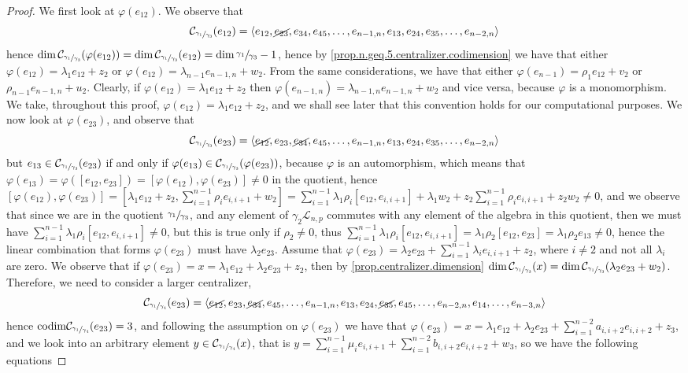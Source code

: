\documentclass[12pt,fleqn]{article}
\begin{document}
\begin{proof}
We first look at $\varphi(e_{12})$. We observe that \[\mathcal{C}_{\sfrac{\gamma_1}{\gamma_3}}(e_{12})=\langle e_{12},\cancel{e_{23}},e_{34},e_{45},\dots,e_{n-1,n},e_{13},e_{24},e_{35},\dots,e_{n-2,n}\rangle\] hence $\dim\mathcal{C}_{\sfrac{\gamma_1}{\gamma_3}}(\varphi(e_{12}))=\dim\mathcal{C}_{\sfrac{\gamma_1}{\gamma_3}}(e_{12})=\dim\sfrac{\gamma_1}{\gamma_3}-1$, hence by \ref{prop.n.geq.5.centralizer.codimension} we have that either $\varphi(e_{12})=\lambda_1 e_{12}+z_2$ or $\varphi(e_{12})=\lambda_{n-1}e_{n-1,n}+w_2$. From the same considerations, we have that either $\varphi(e_{n-1})=\rho_1 e_{12}+v_2$ or $\rho_{n-1}e_{n-1,n}+u_2$. Clearly, if $\varphi(e_{12})=\lambda_1 e_{12}+z_2$ then $\varphi(e_{n-1,n})=\lambda_{n-1,n} e_{n-1,n}+w_2$ and vice versa, because $\varphi$ is a monomorphism. We take, throughout this proof, $\varphi(e_{12})=\lambda_1 e_{12}+z_2$, and we shall see later that this convention holds for our computational purposes. We now look at $\varphi(e_{23})$, and observe that \[\mathcal{C}_{\sfrac{\gamma_1}{\gamma_3}}(e_{23})=\langle\cancel{e_{12}},e_{23},\cancel{e_{34}},e_{45},\dots,e_{n-1,n},e_{13},e_{24},e_{35},\dots,e_{n-2,n}\rangle\] 
but $e_{13}\in\mathcal{C}_{\sfrac{\gamma_1}{\gamma_3}}(e_{23})$ if and only if $\varphi(e_{13})\in\mathcal{C}_{\sfrac{\gamma_1}{\gamma_3}}(\varphi(e_{23}))$, because $\varphi$ is an automorphism, which means that  $\varphi(e_{13})=\varphi([e_{12},e_{23}])=[\varphi(e_{12}),\varphi(e_{23})]\neq 0$ in the quotient, hence $[\varphi(e_{12}),\varphi(e_{23})]=[\lambda_1 e_{12}+z_2,\sum_{i=1}^{n-1}\rho_i e_{i,i+1}+w_2]=\sum_{i=1}^{n-1}\lambda_1\rho_i [e_{12},e_{i,i+1}]+\lambda_1 w_2+z_2\sum_{i=1}^{n-1}\rho_i e_{i,i+1}+z_2 w_2\neq 0$, and we observe that since we are in the quotient $\sfrac{\gamma_1}{\gamma_3}$, and any element of $\gamma_2\mathcal{L}_{n,p}$ commutes with any element of the algebra in this quotient, then we must have $\sum_{i=1}^{n-1}\lambda_1\rho_i [e_{12},e_{i,i+1}]\neq 0$, but this is true only if $\rho_2\neq 0$, thus $\sum_{i=1}^{n-1}\lambda_1\rho_i [e_{12},e_{i,i+1}]=\lambda_1\rho_2[e_{12},e_{23}]=\lambda_1\rho_2 e_{13}\neq 0$, hence the linear combination that forms $\varphi(e_{23})$ must have $\lambda_2 e_{23}$. Assume that $\varphi(e_{23})=\lambda_2 e_{23}+\sum_{i=1}^{n-1}\lambda_i e_{i,i+1}+z_2$, where $i\neq 2$ and not all $\lambda_i$ are zero. We observe that if $\varphi(e_{23})=x=\lambda_1 e_{12}+\lambda_2 e_{23}+z_2$, then by \ref{prop.centralizer.dimension} $\dim\mathcal{C}_{\sfrac{\gamma_1}{\gamma_3}}(x)=\dim\mathcal{C}_{\sfrac{\gamma_1}{\gamma_3}}(\lambda_2 e_{23}+w_2)$. Therefore, we need to consider a larger centralizer, \[\mathcal{C}_{\sfrac{\gamma_1}{\gamma_4}}(e_{23})=\langle \cancel{e_{12}},e_{23},\cancel{e_{34}},e_{45},\dots,e_{n-1,n},e_{13},e_{24},\cancel{e_{35}},e_{45},\dots,e_{n-2,n},e_{14},\dots,e_{n-3,n}\rangle\] hence $\mathrm{codim}\mathcal{C}_{\sfrac{\gamma_1}{\gamma_4}}(e_{23})=3$, and following the assumption on $\varphi(e_{23})$ we have that $\varphi(e_{23})=x=\lambda_1 e_{12}+\lambda_2 e_{23}+\sum_{i=1}^{n-2}a_{i,i+2}e_{i,i+2}+z_3$, and we look into an arbitrary element $y\in\mathcal{C}_{\sfrac{\gamma_1}{\gamma_4}}(x)$, that is $y=\sum_{i=1}^{n-1}\mu_i e_{i,i+1}+\sum_{i=1}^{n-2}b_{i,i+2}e_{i,i+2}+w_3$, so we have the following equations 

\end{proof}
\end{document}
